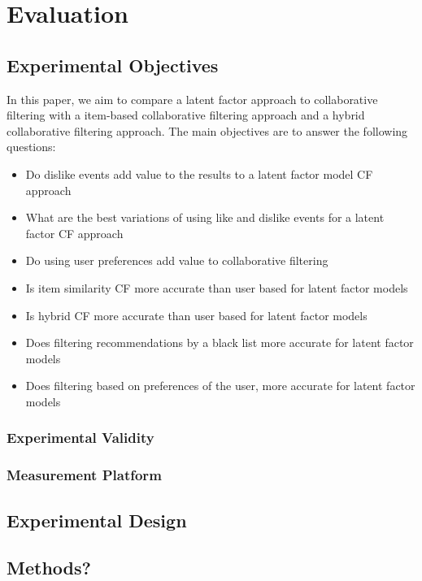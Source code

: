 \chapter{Evaluation}\label{C:evaluation}

\section{Experimental Objectives}
In this paper, we aim to compare a latent factor approach to collaborative filtering with a item-based collaborative filtering approach and a hybrid collaborative filtering approach. The main objectives are to answer the following questions:
\begin{itemize}
	\item{Do dislike events add value to the results to a latent factor model CF approach}
	\item{What are the best variations of using like and dislike events for a latent factor CF approach}
	\item{Do using user preferences add value to collaborative filtering}
	\item{Is item similarity CF more accurate than user based for latent factor models}
	\item{Is hybrid CF more accurate than user based for latent factor models}
	\item{Does filtering recommendations by a black list more accurate for latent factor models}
	\item{Does filtering based on preferences of the user, more accurate for latent factor models}
\end{itemize}

\subsection{Experimental Validity}

\subsection{Measurement Platform}

\section{Experimental Design}


\section{Methods?}

